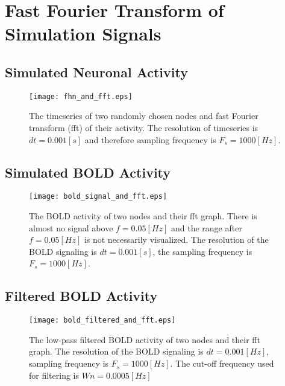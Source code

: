 \documentclass[12pt]{article}
\begin{document}
\newpage

\section{Fast Fourier Transform of Simulation Signals}

\subsection{Simulated Neuronal Activity}

\begin{figure}[htp!]
  \centering
  \texttt{[image: fhn\_and\_fft.eps]}   


	\label{figur}\caption{The timeseries of two randomly chosen nodes and fast Fourier transform (fft) of their activity. The resolution of timeseries is $dt=0.001[s]$ and therefore sampling frequency is $F_s=1000[Hz]$.}
	
\end{figure}



\subsection{Simulated BOLD Activity}

\begin{figure}[htp!]
  \centering
  \texttt{[image: bold\_signal\_and\_fft.eps]}   


	\label{figur}\caption{The BOLD activity of two nodes and their fft graph. There is almost no signal above $f=0.05[Hz]$ and the range after $f=0.05[Hz]$ is not necessarily visualized. The resolution of the BOLD signaling is $dt=0.001[s]$, the sampling frequency is $F_s=1000[Hz]$.}
	
\end{figure}


\subsection{Filtered BOLD Activity}

\begin{figure}[htp!]
  \centering
  \texttt{[image: bold\_filtered\_and\_fft.eps]}   


	\label{figur}\caption{The low-pass filtered BOLD activity of two nodes and their fft graph. The resolution of the BOLD signaling is $dt=0.001[Hz]$, sampling frequency is $F_s=1000[Hz]$. The cut-off frequency used for filtering is $Wn = 0.0005 [Hz]$}
	
\end{figure}
\end{document}
